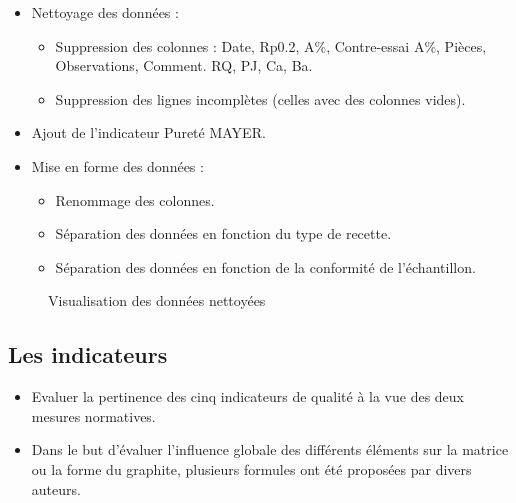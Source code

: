 \documentclass[12pt]{article}
\begin{document}
\begin{itemize}
\item Nettoyage des données :
\begin{itemize}
\item Suppression des colonnes : Date, Rp0.2, A\%, Contre-essai A\%, Pièces, Observations, Comment. RQ, PJ, Ca, Ba.
\item Suppression des lignes incomplètes (celles avec des colonnes vides).
\end{itemize}
\item Ajout de l'indicateur Pureté MAYER.
\item Mise en forme des données :
\begin{itemize}
\item Renommage des colonnes.
\item Séparation des données en fonction  du type de recette.
\item Séparation des données en fonction de la conformité de l'échantillon.
\end{itemize}
\end{itemize}
    


\begin{figure}[H]
    \centering
    \caption{Visualisation des données nettoyées}
    \label{fig:donnees_nettoyees}
\end{figure}


\subsection{Les indicateurs}





\begin{itemize}
  \item  Evaluer la pertinence des cinq indicateurs de qualité à la vue des deux mesures normatives.
  \item Dans le but d'évaluer l'influence globale des différents éléments sur la matrice ou la forme du graphite, plusieurs formules ont été proposées par divers auteurs.
\end{itemize}
\end{document}
